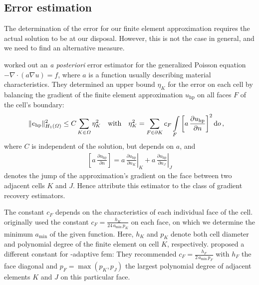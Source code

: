 \subsection{Error estimation}
\label{ssec:estimation}


The determination of the error for our finite element approximation requires the actual solution to be at our disposal. However, this is not the case in general, and we need to find an alternative measure.

\textcite{kelly1983} worked out an \textit{a posteriori} error estimator for the generalized Poisson equation $-\nabla \cdot \left( a \nabla u \right) = f$, where $a$ is a function usually describing material characteristics. They determined an upper bound $\eta_K$ for the error on each cell by balancing the gradient of the finite element approximation $u_\text{hp}$ on all faces $F$ of the cell's boundary:
\begin{align}
\label{eq:kelly} \|e_\text{hp}\|_{H_1(\Omega)}^2 &\leq C \sum\limits_{K \in \Omega} \eta_K^2 &&\text{with}&  \eta_K^2 &= \sum\limits_{F \in \partial K} c_F \int\limits_{F} \left[ a \, \frac{\partial u_\text{hp}}{\partial n} \right]^2 \mathop{}\!\mathrm{d}o \,\text{,}
\end{align}
where $C$ is independent of the solution, but depends on $a$, and
\begin{align*}
\left[ a \, \frac{\partial u_\text{hp}}{\partial n} \right] = \left. a \, \frac{\partial u_\text{hp}}{\partial n_K} \right|_K + \left. a \, \frac{\partial u_\text{hp}}{\partial n_J}\right|_J
\end{align*}
denotes the jump of the approximation's gradient on the face between two adjacent cells $K$ and $J$. Hence \textcite{ainsworth1997a} attribute this estimator to the class of gradient recovery estimators.

The constant $c_F$ depends on the characteristics of each individual face of the cell. \textcite{kelly1983} originally used the constant $c_F = \frac{h_K}{24 \, a_\text{min} \, p_K}$ on each face, on which we determine the minimum $a_\text{min}$ of the given function. Here, $h_K$ and $p_K$ denote both cell diameter and polynomial degree of the finite element on cell $K$, respectively. \textcite{davydov2017} proposed a different constant for \hp-adaptive \gls{fem}: They recommended $c_F = \frac{h_F}{2 \, a_\text{min} \, p_F}$ with $h_F$ the face diagonal and $p_F = \max\left(p_K, p_J\right)$ the largest polynomial degree of adjacent elements $K$ and $J$ on this particular face.

